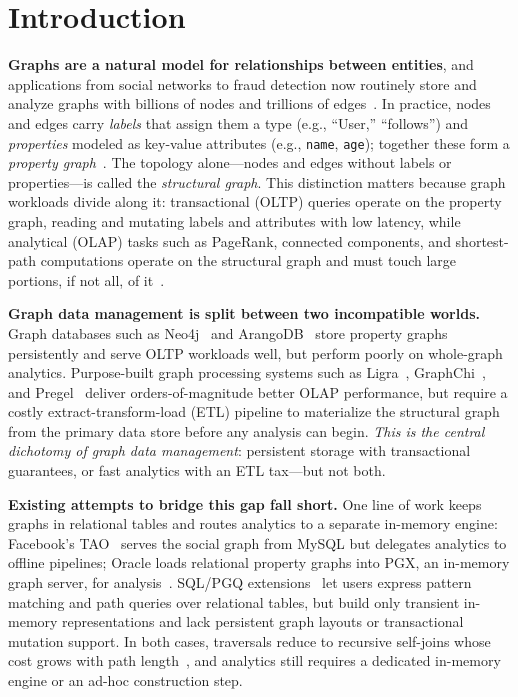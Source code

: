 \section{Introduction}
\label{sec:intro}

\textbf{Graphs are a natural model for relationships between entities}, and applications from social networks to fraud detection now routinely store and analyze graphs with billions of nodes and trillions of edges~\cite{ubiquityLargeGraphsVLDB2017,ching2015oneTrillion,besta2020demystifying,gupta2024graphscale,zhou2025redtao}.
In practice, nodes and edges carry \emph{labels} that assign them a type (e.g., ``User,'' ``follows'') and \emph{properties} modeled as key-value attributes (e.g., \texttt{name}, \texttt{age}); together these form a \emph{property graph}~\cite{Angles_Arenas_Barceló_Hogan_Reutter_Vrgoč_2018}.
The topology alone---nodes and edges without labels or properties---is called the \emph{structural graph}.
This distinction matters because graph workloads divide along it: transactional (OLTP) queries operate on the property graph, reading and mutating labels and attributes with low latency, while analytical (OLAP) tasks such as PageRank, connected components, and shortest-path computations operate on the structural graph and must touch large portions, if not all, of it~\cite{tang2022taming,qiu2018real}.

\textbf{Graph data management is split between two incompatible worlds.}
Graph databases such as Neo4j~\cite{neo4j} and ArangoDB~\cite{arangodb} store property graphs persistently and serve OLTP workloads well, but perform poorly on whole-graph analytics.
Purpose-built graph processing systems such as Ligra~\cite{shun2013ligra}, GraphChi~\cite{kyrola2012graphchi}, and Pregel~\cite{malewicz2010pregel} deliver orders-of-magnitude better OLAP performance, but require a costly extract-transform-load (ETL) pipeline to materialize the structural graph from the primary data store before any analysis can begin.
\textit{This is the central dichotomy of graph data management}: persistent storage with transactional guarantees, or fast analytics with an ETL tax---but not both.

\textbf{Existing attempts to bridge this gap fall short.}
One line of work keeps graphs in relational tables and routes analytics to a separate in-memory engine: Facebook's TAO~\cite{bronson2013tao} serves the social graph from MySQL but delegates analytics to offline pipelines; Oracle loads relational property graphs into PGX, an in-memory graph server, for analysis~\cite{OraclePG,WhatIsOracleSpatialGraph:online,hong2015pgx,welc2013graph,graphProcessingRDBMS,hong2013early}.
SQL/PGQ extensions~\cite{duckpgq:online} let users express pattern matching and path queries over relational tables, but build only transient in-memory representations and lack persistent graph layouts or transactional mutation support.
In both cases, traversals reduce to recursive self-joins whose cost grows with path length~\cite{10.1145/3129246,TransitiveClosureBiskupStiefeling1989}, and analytics still requires a dedicated in-memory engine or an ad-hoc construction step.

